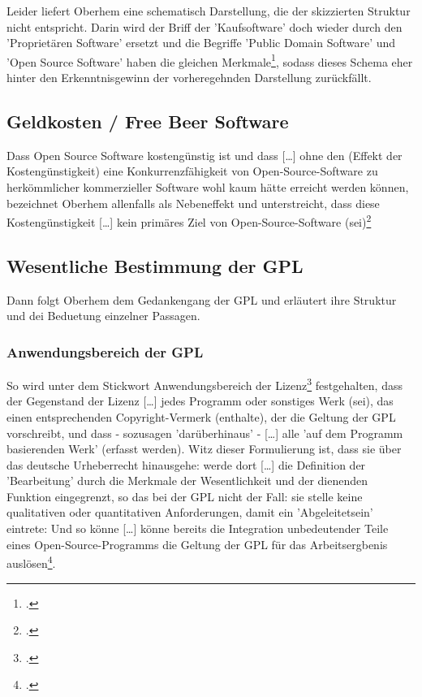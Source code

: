\documentclass[DIV=calc,BCOR=5mm,11pt,headings=small,oneside,abstract=true, toc=bib]{scrartcl}
\begin{document}
Leider liefert Oberhem eine \glqq{}schematisch Darstellung\grqq{}, die der
skizzierten Struktur nicht entspricht. Darin wird der Briff der 'Kaufsoftware'
doch wieder durch den 'Proprietären Software' ersetzt und die Begriffe 'Public
Domain Software' und 'Open Source Software' haben die gleichen
Merkmale\footcite[vgl.][33]{Oberhem2008a}, sodass dieses Schema eher hinter den
Erkenntnisgewinn der vorheregehnden Darstellung zurückfällt.


\subsection{Geldkosten / Free Beer Software}

Dass Open Source Software kostengünstig ist und dass \glqq{}[\ldots]
ohne den (Effekt der Kostengünstigkeit) eine Konkurrenzfähigkeit von
Open-Source-Software zu herkömmlicher kommerzieller Software wohl kaum
hätte erreicht werden können\grqq{}, bezeichnet Oberhem allenfalls als
\glqq{}Nebeneffekt\grqq{} und unterstreicht, dass diese Kostengünstigkeit
\glqq{}[\ldots] kein primäres Ziel von Open-Source-Software
(sei)\grqq{}\footcite[vgl.][8]{Oberhem2008a}

\subsection{Wesentliche Bestimmung der GPL}

Dann folgt Oberhem dem Gedankengang der GPL und erläutert ihre Struktur und dei
Beduetung einzelner Passagen.

\subsubsection{Anwendungsbereich der GPL}

So wird unter dem Stickwort \glqq{}Anwendungsbereich der
Lizenz\grqq{}\footcite[vgl.][34]{Oberhem2008a} festgehalten, dass der
\glqq{}Gegenstand der Lizenz [\ldots] jedes Programm oder sonstiges Werk
(sei), das einen entsprechenden Copyright-Vermerk (enthalte), der die
Geltung der GPL vorschreibt\grqq{}, und dass - sozusagen 'darüberhinaus' -
\glqq{}[\ldots] alle 'auf dem Programm basierenden Werk' (erfasst
werden)\grqq{}. Witz dieser Formulierung ist, dass sie über das deutsche
Urheberrecht hinausgehe: werde dort \glqq{}[\ldots] die Definition der
'Bearbeitung' durch die Merkmale der Wesentlichkeit und der dienenden
Funktion eingegrenzt\grqq{}, so das bei der GPL nicht der Fall: sie stelle
\glqq{}keine qualitativen oder quantitativen Anforderungen\grqq{}, damit ein
'Abgeleitetsein' eintrete: Und so könne \glqq{}[\ldots] könne bereits die
Integration unbedeutender Teile eines Open-Source-Programms die Geltung
der GPL für das Arbeitsergbenis
auslösen\grqq{}\footcite[vgl.][35]{Oberhem2008a}.
\end{document}
